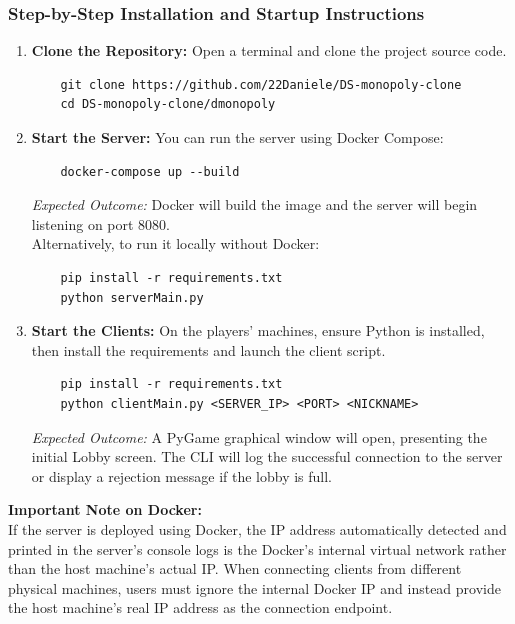 \documentclass{scrartcl}
\begin{document}
\subsubsection*{Step-by-Step Installation and Startup Instructions}\label{installation}

\begin{enumerate}
    \item \textbf{Clone the Repository:}
    Open a terminal and clone the project source code.
    \begin{verbatim}
    git clone https://github.com/22Daniele/DS-monopoly-clone
    cd DS-monopoly-clone/dmonopoly
    \end{verbatim}

    \item \textbf{Start the Server:}
    You can run the server using Docker Compose:
    \begin{verbatim}
    docker-compose up --build
    \end{verbatim}
    \textit{Expected Outcome:} Docker will build the image and the server will begin listening on port 8080.
    \\
    Alternatively, to run it locally without Docker:
    \begin{verbatim}
    pip install -r requirements.txt
    python serverMain.py
    \end{verbatim}

    \item \textbf{Start the Clients:}
    On the players' machines, ensure Python is installed, then install the requirements and launch the client script.
    \begin{verbatim}
    pip install -r requirements.txt
    python clientMain.py <SERVER_IP> <PORT> <NICKNAME>
    \end{verbatim}
    \textit{Expected Outcome:} A PyGame graphical window will open, presenting the initial Lobby screen.
    The CLI will log the successful connection to the server or display a rejection message if the lobby is full.
\end{enumerate}
\vspace{0.5cm}
\noindent\textbf{Important Note on Docker:} \\
If the server is deployed using Docker, the IP address automatically detected and printed in the server's console logs is the
Docker's internal virtual network rather than the host machine's actual IP.
When connecting clients from different physical machines, users must ignore the internal Docker IP and instead provide
the host machine's real IP address as the connection endpoint.
\end{document}
